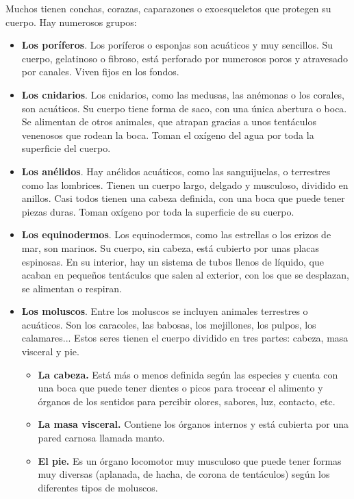 Muchos tienen conchas, corazas, caparazones o exoesqueletos que protegen su cuerpo. Hay numerosos grupos:
\begin{itemize}
    \item \textbf{Los poríferos}. Los poríferos o esponjas son acuáticos y muy sencillos. Su cuerpo, gelatinoso o fibroso, está perforado por numerosos poros y atravesado por canales. Viven fijos en los fondos.
    \item \textbf{Los cnidarios}. Los cnidarios, como las medusas, las anémonas o los corales, son acuáticos. Su cuerpo tiene forma de saco, con una única abertura o boca. Se alimentan de otros animales, que atrapan gracias a unos tentáculos venenosos que rodean la boca. Toman el oxígeno del agua por toda la superficie del cuerpo.
    \item \textbf{Los anélidos}. Hay anélidos acuáticos, como las sanguijuelas, o terrestres como las lombrices. Tienen un cuerpo largo, delgado y musculoso, dividido en anillos. Casi todos tienen una cabeza definida, con una boca que puede tener piezas duras. Toman oxígeno por toda la superficie de su cuerpo.
    \item \textbf{Los equinodermos}. Los equinodermos, como las estrellas o los erizos de mar, son marinos. Su cuerpo, sin cabeza, está cubierto por unas placas espinosas. En su interior, hay un sistema de tubos llenos de líquido, que acaban en pequeños tentáculos que salen al exterior, con los que se desplazan, se alimentan o respiran.
    \item \textbf{Los moluscos}. Entre los moluscos se incluyen animales terrestres o acuáticos. Son los caracoles, las babosas, los mejillones, los pulpos, los calamares... Estos seres tienen el cuerpo dividido en tres partes: cabeza, masa visceral y pie.
    \begin{itemize}
        \item \textbf{La cabeza.} Está más o menos definida según las especies y cuenta con una boca que puede tener dientes o picos para trocear el alimento y órganos de los sentidos para percibir olores, sabores, luz, contacto, etc.
        \item \textbf{La masa visceral.} Contiene los órganos internos y está cubierta por una pared carnosa llamada manto.
        \item \textbf{El pie.} Es un órgano locomotor muy musculoso que puede tener formas muy diversas (aplanada, de hacha, de corona de tentáculos) según los diferentes tipos de moluscos.
    \end{itemize}

\end{itemize}
